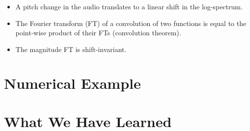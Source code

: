 \documentclass[journal]{IEEEtran}
\begin{document}
\begin{itemize}
\item A pitch change in the audio translates to a linear shift in the log-spectrum.
\item The Fourier transform (FT) of a convolution of two functions is equal to the point-wise product of their FTs (convolution theorem).
\item The magnitude FT is shift-invariant.
\end{itemize}



\section{Numerical Example}

%




\section{What We Have Learned}
\end{document}
